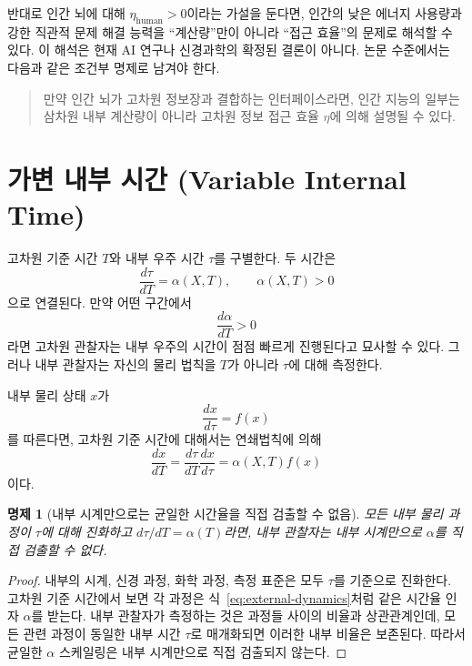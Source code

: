 \documentclass[11pt]{article}
\newtheorem{proposition}{명제}
\theoremstyle{remark}
\begin{document}
반대로 인간 뇌에 대해 $\eta_{\mathrm{human}}>0$이라는 가설을 둔다면,
인간의 낮은 에너지 사용량과 강한 직관적 문제 해결 능력을 ``계산량''만이
아니라 ``접근 효율''의 문제로 해석할 수 있다. 이 해석은 현재 AI 연구나
신경과학의 확정된 결론이 아니다. 논문 수준에서는 다음과 같은 조건부 명제로
남겨야 한다.

\begin{quote}
만약 인간 뇌가 고차원 정보장과 결합하는 인터페이스라면, 인간 지능의 일부는
삼차원 내부 계산량이 아니라 고차원 정보 접근 효율 $\eta$에 의해 설명될 수
있다.
\end{quote}

\section{가변 내부 시간 (Variable Internal Time)}

고차원 기준 시간 $T$와 내부 우주 시간 $\tau$를 구별한다. 두 시간은
\begin{equation}
  \frac{d\tau}{dT}=\alpha(X,T),\qquad \alpha(X,T)>0
  \label{eq:time-rate}
\end{equation}
으로 연결된다. 만약 어떤 구간에서
\begin{equation}
  \frac{d\alpha}{dT}>0
\end{equation}
라면 고차원 관찰자는 내부 우주의 시간이 점점 빠르게 진행된다고 묘사할 수
있다. 그러나 내부 관찰자는 자신의 물리 법칙을 $T$가 아니라 $\tau$에 대해
측정한다.

내부 물리 상태 $x$가
\begin{equation}
  \frac{dx}{d\tau}=f(x)
\end{equation}
를 따른다면, 고차원 기준 시간에 대해서는 연쇄법칙에 의해
\begin{equation}
  \frac{dx}{dT}
  =
  \frac{d\tau}{dT}\frac{dx}{d\tau}
  =
  \alpha(X,T)f(x)
  \label{eq:external-dynamics}
\end{equation}
이다.

\begin{proposition}[내부 시계만으로는 균일한 시간율을 직접 검출할 수 없음]
모든 내부 물리 과정이 $\tau$에 대해 진화하고
$d\tau/dT=\alpha(T)$라면, 내부 관찰자는 내부 시계만으로 $\alpha$를 직접
검출할 수 없다.
\end{proposition}

\begin{proof}
내부의 시계, 신경 과정, 화학 과정, 측정 표준은 모두 $\tau$를 기준으로
진화한다. 고차원 기준 시간에서 보면 각 과정은 식~\eqref{eq:external-dynamics}처럼
같은 시간율 인자 $\alpha$를 받는다. 내부 관찰자가 측정하는 것은 과정들
사이의 비율과 상관관계인데, 모든 관련 과정이 동일한 내부 시간 $\tau$로
매개화되면 이러한 내부 비율은 보존된다. 따라서 균일한 $\alpha$ 스케일링은
내부 시계만으로 직접 검출되지 않는다.
\end{proof}
\end{document}
